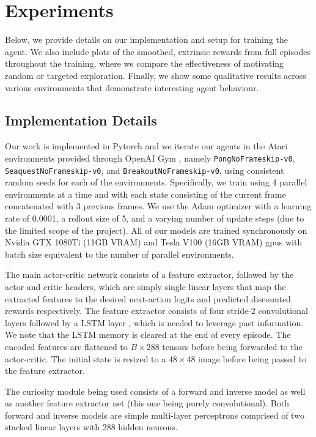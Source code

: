 \documentclass{article}
\begin{document}
\section{Experiments}
Below, we provide details on our implementation and setup for training the agent. We also include plots of the smoothed, extrinsic rewards from full episodes throughout the training, where we compare the effectiveness of motivating random or targeted exploration. Finally, we show some qualitative results across various environments that demonstrate interesting agent behaviour.

\subsection{Implementation Details}
Our work is implemented in Pytorch and we iterate our agents in the Atari environments provided through OpenAI Gym \cite{ppo, gym}, namely \texttt{PongNoFrameskip-v0}, \texttt{SeaquestNoFrameskip-v0}, and \texttt{BreakoutNoFrameskip-v0}, using consistent random seeds for each of the environments. Specifically, we train using 4 parallel environments at a time and with each state consisting of the current frame concatenated with 3 previous frames. We use the Adam optimizer \cite{adam} with a learning rate of 0.0001, a rollout size of 5, and a varying number of update steps (due to the limited scope of the project). All of our models are trained synchronously on Nvidia GTX 1080Ti (11GB VRAM) and Tesla V100 (16GB VRAM) gpus with batch size equivalent to the number of parallel environments.

The main actor-critic network consists of a feature extractor, followed by the actor and critic headers, which are simply single linear layers that map the extracted features to the desired next-action logits and predicted discounted rewards respectively. The feature extractor consists of four stride-2 convolutional layers followed by a LSTM layer \cite{lstm}, which is needed to leverage past information. We note that the LSTM memory is cleared at the end of every episode. The encoded features are flattened to $B\times 288$ tensors before being forwarded to the actor-critic. The initial state is resized to a $48\times 48$ image before being passed to the feature extractor.

The curiosity module being used consists of a forward and inverse model as well as another feature extractor net (this one being purely convolutional). Both forward and inverse models are simple multi-layer perceptrons comprised of two stacked linear layers with 288 hidden neurons.
\end{document}
